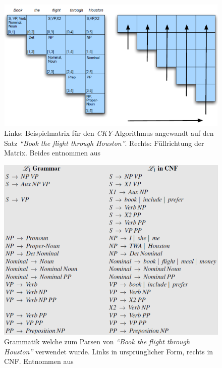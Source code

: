 \begin{figure} [h]
\includegraphics[width=\textwidth]{gfx/cky-beispiel.png} 
\caption{Links: Beispielmatrix für den \textit{CKY}-Algorithmus angewandt auf den Satz \textit{``Book the flight through Houston''}. Rechts: Füllrichtung der Matrix. Beides entnommen aus \cite[S. 473]{nlpGrundlagen}
}	
\label{fig:cky-beispiel}
\end{figure}

\begin{figure} [h]
\includegraphics[width=\textwidth]{gfx/grammatik-cky-beispiel.png} 
\caption{Grammatik welche zum Parsen von \textit{``Book the flight through Houston''} verwendet wurde. Links in ursprünglicher Form, rechts in CNF. Entnommen aus \cite[S. 472]{nlpGrundlagen}
}	
\label{fig:cky-beispiel}
\end{figure}

